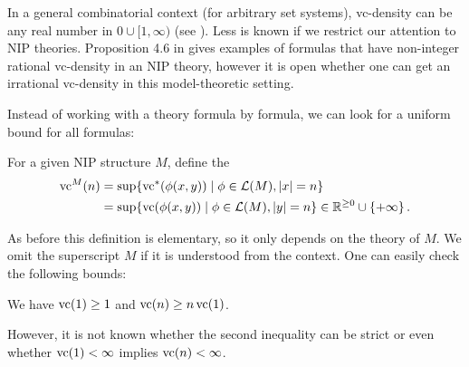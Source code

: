 In a general combinatorial context (for arbitrary set systems),
vc-density can be any real number in $0 \cup [1, \infty)$ (see \cite{ash8}).
Less is known if we restrict our attention to NIP theories.
Proposition 4.6 in \cite{density} gives examples of formulas that have non-integer rational vc-density in an NIP theory,
however it is open whether one can get an irrational vc-density in this model-theoretic setting.

Instead of working with a theory formula by formula, we can look for a uniform bound for all formulas:
\begin{Definition} \label{vc_fn_def}
  For a given NIP structure $M$, define the 
  \begin{align*}
    \operatorname{vc}^M(n) &= \sup \{\operatorname{vc}^*(\phi(x, y)) \mid \phi \in \mathcal L(M), |x| = n\} \\
             &= \sup \{\operatorname{vc}(\phi(x, y)) \mid \phi \in \mathcal L(M), |y| = n\} \in \mathbb{R}^{\geq 0} \cup \left\{+\infty\right\}.
  \end{align*}
\end{Definition}

As before this definition is elementary, so it only depends on the theory of $M$.
We omit the superscript $M$ if it is understood from the context.
One can easily check the following bounds:
\begin{Lemma}  We have $\operatorname{vc}(1) \geq 1$ and $\operatorname{vc}(n) \geq n\operatorname{vc}(1)$.
  
\end{Lemma}

However, it is not known whether the second inequality can be strict or even whether $\operatorname{vc}(1) < \infty$ implies $\operatorname{vc}(n) < \infty$.
